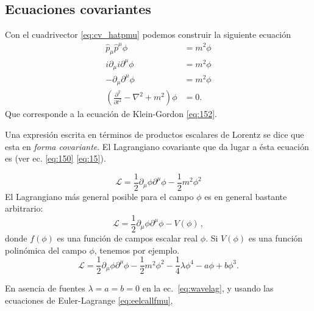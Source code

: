 \subsection{Ecuaciones covariantes}
\label{sec:ecuac-covar}

\begin{frame}
Con el cuadrivector \eqref{eq:cv_hatpmu} podemos construir la
siguiente ecuaci\'on
\begin{align}
  \hat{p}_\mu\hat{p}^\mu\phi&=m^2\phi\nonumber\\
  i\partial_\mu i\partial^\mu\phi&=m^2\phi\nonumber\\
  -\partial_\mu\partial^\mu\phi&=m^2\phi\nonumber\\
  \label{eq:waveec}
  \left(\frac{\partial^2}{\partial t^2}-\nabla^2+m^2\right)\phi&=0.
\end{align}
Que corresponde a la ecuaci\'on de Klein-Gordon \eqref{eq:152}.
\end{frame}
Una expresi\'on escrita en t\'erminos de productos escalares de Lorentz se dice que esta en \emph{forma covariante}. El Lagrangiano covariante que da lugar a
\'esta ecuaci\'on es (ver ec. \eqref{eq:150}
\eqref{eq:15}). %

\begin{equation}
  \label{eq:wavelagtrue}
  \mathcal{L}=\frac{1}{2}\partial_\mu\phi\partial^\mu\phi-\frac{1}{2}m^2\phi^2
\end{equation}
El Lagrangiano m\'as general posible para el campo $\phi$ es en general bastante arbitrario:
\begin{equation}
  \mathcal{L}=\frac{1}{2}\partial_\mu\phi\partial^\mu\phi-V(\phi)\,,
\end{equation}
donde $f(\phi)$ es una función de campos escalar real $\phi$. Si $V(\phi)$ es una función polinómica del campo $\phi$, tenemos por ejemplo.
\begin{equation}
  \label{eq:wavelag}
  \mathcal{L}=\frac{1}{2}\partial_\mu\phi\partial^\mu\phi-\frac{1}{2}m^2\phi^2-\frac{1}{4}\lambda\phi^4-a\phi+b\phi^3.
\end{equation}

En asencia de fuentes $\lambda=a=b=0$ en la ec.~\eqref{eq:wavelag}, y usando las
ecuaciones de Euler-Lagrange \eqref{eq:eelcallfmu},


